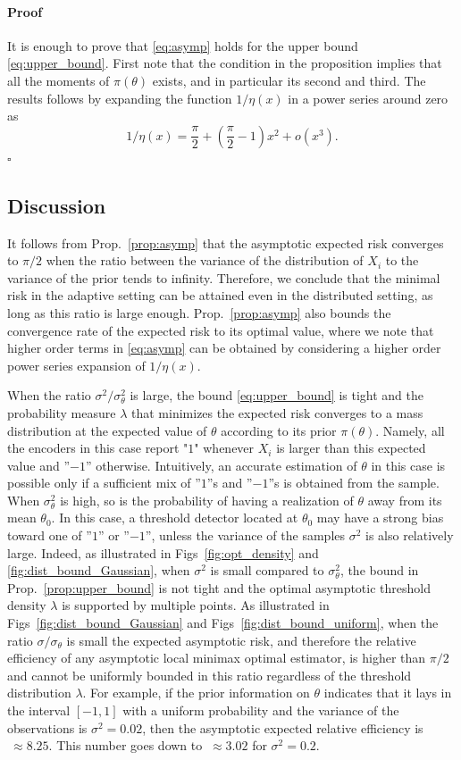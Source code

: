 \documentclass[letterpaper, conference]{IEEEtran}      %
\newenvironment{proof}{\paragraph*{Proof}}{\hfill$\square$ \newline}
\begin{document}
\begin{proof}
It is enough to prove that  \eqref{eq:asymp} holds for the upper bound \eqref{eq:upper_bound}. First note that the condition in the proposition implies that all the moments of $\pi(\theta)$ exists, and in particular its second and third. The results follows by expanding the function $1/\eta(x)$ in a power series around zero as
\[
1/\eta(x) = \frac{\pi}{2} + \left(\frac{\pi}{2}-1 \right) x^2 + o(x^3).
\]
\end{proof}


\subsection{Discussion}
It follows from Prop.~\ref{prop:asymp} that the asymptotic expected risk converges to $\pi/2$ when the ratio between the variance of the distribution of $X_i$ to the variance of the prior tends to infinity. Therefore, we conclude that the minimal risk in the adaptive setting can be attained even in the distributed setting, as long as this ratio is large enough. Prop.~\ref{prop:asymp} also bounds the convergence rate of the expected risk to its optimal value, where we note that higher order terms in \eqref{eq:asymp} can be obtained by considering a higher order power series expansion of $1/\eta(x)$. \par
When the ratio $\sigma^2/ \sigma_\theta^2$ is large, the bound \eqref{eq:upper_bound} is tight and the probability measure $\lambda$ that minimizes the expected risk converges to a mass distribution at the expected value of $\theta$ according to its prior $\pi(\theta)$. Namely, all the encoders in this case report "$1$" whenever $X_i$ is larger than this expected value and ''$-1$'' otherwise. Intuitively, an accurate estimation of $\theta$ in this case is possible only if a sufficient mix of ''$1$''s and ''$-1$''s is obtained from the sample. When $\sigma_\theta^2$ is high, so is the probability of having a realization of $\theta$ away from its mean $\theta_0$. In this case, a threshold detector located at $\theta_0$ may have a strong bias toward one of ''$1$'' or ''$-1$'', unless the variance of the samples $\sigma^2$ is also relatively large. Indeed, as illustrated in Figs~\ref{fig:opt_density} and \ref{fig:dist_bound_Gaussian}, when $\sigma^2$ is small compared to $\sigma_\theta^2$, the bound in Prop.~\ref{prop:upper_bound} is not tight and the optimal asymptotic threshold density $\lambda$ is supported by multiple points. As illustrated in Figs~\ref{fig:dist_bound_Gaussian} and Figs~\ref{fig:dist_bound_uniform}, when the ratio $\sigma/\sigma_\theta$ is small the expected asymptotic risk, and therefore the relative efficiency of any asymptotic local minimax optimal estimator, is higher than $\pi/2$ and cannot be uniformly bounded in this ratio regardless of the threshold distribution $\lambda$. For example, if the prior information on $\theta$ indicates that it lays in the interval $[-1,1]$ with a uniform probability and the variance of the observations is $\sigma^2 = 0.02$, then the asymptotic expected relative efficiency is $~\approx 8.25$. This number goes down to $~\approx 3.02$ for $\sigma^2 = 0.2$. 
\\
\end{document}
